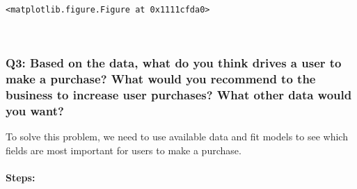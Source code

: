 \documentclass[11pt]{article}
\begin{document}
    
    \begin{verbatim}
<matplotlib.figure.Figure at 0x1111cfda0>
    \end{verbatim}

    
    \begin{center}
    \end{center}
    { \hspace*{\fill} \\}
    
    \subsubsection{Q3: Based on the data, what do you think drives a user to
make a purchase? What would you recommend to the business to increase
user purchases? What other data would you
want?}\label{q3-based-on-the-data-what-do-you-think-drives-a-user-to-make-a-purchase-what-would-you-recommend-to-the-business-to-increase-user-purchases-what-other-data-would-you-want}

To solve this problem, we need to use available data and fit models to
see which fields are most important for users to make a purchase.

\paragraph{Steps:}\label{steps}
\end{document}
